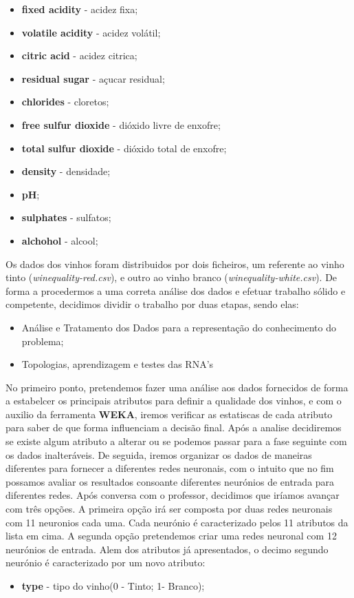 \documentclass{report}
\begin{document}
\bigbreak
\begin{itemize}
\item{\textbf{fixed acidity} - acidez fixa;} 
\item{\textbf{volatile acidity} - acidez volátil;}
\item{\textbf{citric acid} - acidez citrica;}
\item{\textbf{residual sugar} - açucar residual;}
\item{\textbf{chlorides} - cloretos;}
\item{\textbf{free sulfur dioxide} - dióxido livre de enxofre;}
\item{\textbf{total sulfur dioxide} - dióxido total de enxofre;}
\item{\textbf{density} - densidade;}
\item{\textbf{pH};}
\item{\textbf{sulphates} - sulfatos;}
\item{\textbf{alchohol} - alcool;} 
\end{itemize}
\bigbreak

Os dados dos vinhos foram distribuidos por dois ficheiros, um referente ao vinho tinto (\textit{winequality-red.csv}), e outro ao vinho branco (\textit{winequality-white.csv}).
De forma a procedermos a uma correta análise dos dados e efetuar trabalho sólido e competente, decidimos dividir o trabalho por duas etapas, sendo elas:

\bigbreak
\begin{itemize}
\item{Análise e Tratamento dos Dados para a representação do conhecimento do problema;}
\item{Topologias, aprendizagem e testes das RNA's}
\end{itemize}
\bigbreak

No primeiro ponto, pretendemos fazer uma análise aos dados fornecidos de forma a estabelcer os principais atributos para definir a qualidade dos vinhos, e com o auxilio da ferramenta \textbf{WEKA}, iremos verificar as estatiscas de cada atributo para saber de que forma influenciam a decisão final. Após a analise decidiremos se existe algum atributo a alterar ou se podemos passar para a fase seguinte com os dados inalteráveis.
De seguida, iremos organizar os dados de maneiras diferentes para fornecer a diferentes redes neuronais, com o intuito que no fim possamos avaliar os resultados consoante diferentes neurónios de entrada para diferentes redes. Após conversa com o professor, decidimos que iríamos avançar com três opções.
A primeira opção irá ser composta por duas redes neuronais com 11 neuronios cada uma. Cada neurónio é caracterizado pelos 11 atributos da lista em cima.
A segunda opção pretendemos criar uma redes neuronal com 12 neurónios de entrada. Alem dos atributos já apresentados, o decimo segundo neurónio é caracterizado por um novo atributo:
\bigbreak
\begin{itemize}
\item{\textbf{type} - tipo do vinho(0 - Tinto; 1- Branco);} 
\end{itemize}
\bigbreak
\end{document}
